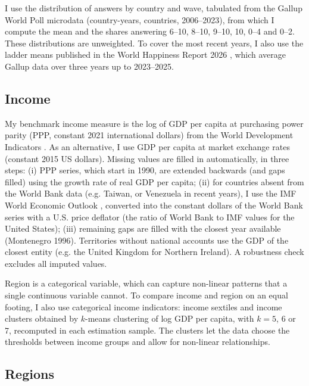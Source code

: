 \documentclass[12pt]{article}
\begin{document}
I use the distribution of answers by country and wave, tabulated from the Gallup World Poll microdata (\nGallupCountryYears country-years, \nGallupCountries countries, 2006--2023), from which I compute the mean and the shares answering 6--10, 8--10, 9--10, 10, 0--4 and 0--2. These distributions are unweighted. To cover the most recent years, I also use the ladder means published in the World Happiness Report 2026 \citep{whr_2026}, which average Gallup data over three years up to 2023--2025.

\subsection{Income}\label{subsec:income}

My benchmark income measure is the log of GDP per capita at purchasing power parity (PPP, constant 2021 international dollars) from the World Development Indicators \citep{worldbank_wdi_2026}. As an alternative, I use GDP per capita at market exchange rates (constant 2015 US dollars). Missing values are filled in automatically, in three steps: (i) PPP series, which start in 1990, are extended backwards (and gaps filled) using the growth rate of real GDP per capita; (ii) for countries absent from the World Bank data (e.g. Taiwan, or Venezuela in recent years), I use the IMF World Economic Outlook \citep{imf_weo_2026}, converted into the constant dollars of the World Bank series with a U.S. price deflator (the ratio of World Bank to IMF values for the United States); (iii) remaining gaps are filled with the closest year available (Montenegro 1996). Territories without national accounts use the GDP of the closest entity (e.g. the United Kingdom for Northern Ireland). A robustness check excludes all imputed values.

\ifshowregion
Region is a categorical variable, which can capture non-linear patterns that a single continuous variable cannot. To compare income and region on an equal footing, I also use categorical income indicators: income sextiles and income clusters obtained by $k$-means clustering of log GDP per capita, with $k = 5$, 6 or 7, recomputed in each estimation sample. The clusters let the data choose the thresholds between income groups and allow for non-linear relationships.
\fi

\ifshowregion
\subsection{Regions}\label{subsec:regions}
\end{document}
